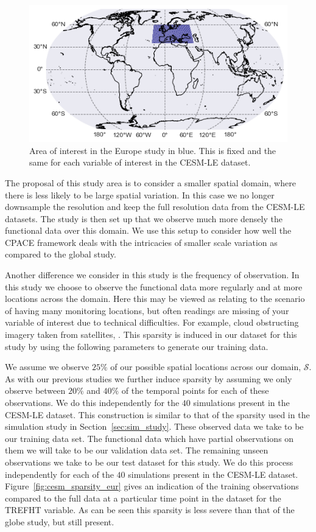 \begin{figure}
	\centering
	\includegraphics[width=\textwidth]{cesm_eur_bbox}
	\caption{Area of interest in the Europe study in blue. This is fixed and the same for each variable of interest in the CESM-LE dataset.}
	\label{fig:cesm_eur_bbox}
\end{figure}

The proposal of this study area is to consider a smaller spatial domain, where there is less likely to be large spatial variation. 
In this case we no longer downsample the resolution and keep the full resolution data from the CESM-LE datasets.
The study is then set up that we observe much more densely the functional data over this domain.
We use this setup to consider how well the CPACE framework deals with the intricacies of smaller scale variation as compared to the global study.

Another difference we consider in this study is the frequency of observation.
In this study we choose to observe the functional data more regularly and at more locations across the domain.
Here this may be viewed as relating to the scenario of having many monitoring locations, but often readings are missing of your variable of interest due to technical difficulties.
For example, cloud obstructing imagery taken from satellites, \citep{meraner_cloud_2020}.
This sparsity is induced in our dataset for this study by using the following parameters to generate our training data.

We assume we observe $25\%$ of our possible spatial locations across our domain, $\mathcal{S}$.
As with our previous studies we further induce sparsity by assuming we only observe between $20\%$ and $40\%$ of the temporal points for each of these observations.
We do this independently for the $40$ simulations present in the CESM-LE dataset.
This construction is similar to that of the sparsity used in the simulation study in Section~\ref{sec:sim_study}.
These observed data we take to be our training data set.
The functional data which have partial observations on them we will take to be our validation data set.
The remaining unseen observations we take to be our test dataset for this study.
We do this process independently for each of the $40$ simulations present in the CESM-LE dataset.
Figure~\ref{fig:cesm_sparsity_eur} gives an indication of the training observations compared to the full data at a particular time point in the dataset for the TREFHT variable.
As can be seen this sparsity is less severe than that of the globe study, but still present.

